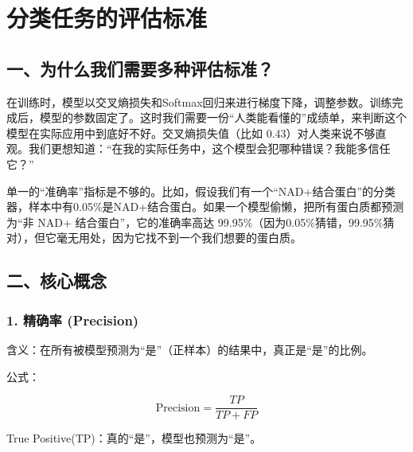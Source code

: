 \setcounter{section}{1}

\hypertarget{ux5206ux7c7bux4efbux52a1ux7684ux8bc4ux4f30ux6807ux51c6}{%
\section{分类任务的评估标准}\label{ux5206ux7c7bux4efbux52a1ux7684ux8bc4ux4f30ux6807ux51c6}}

\hypertarget{ux4e00ux4e3aux4ec0ux4e48ux6211ux4eecux9700ux8981ux591aux79cdux8bc4ux4f30ux6807ux51c6}{%
\subsection{一、为什么我们需要多种评估标准？}\label{ux4e00ux4e3aux4ec0ux4e48ux6211ux4eecux9700ux8981ux591aux79cdux8bc4ux4f30ux6807ux51c6}}

在训练时，模型以交叉熵损失和Softmax回归来进行梯度下降，调整参数。训练完成后，模型的参数固定了。这时我们需要一份``人类能看懂的''成绩单，来判断这个模型在实际应用中到底好不好。交叉熵损失值（比如 0.43）对人类来说不够直观。我们更想知道：``在我的实际任务中，这个模型会犯哪种错误？我能多信任它？''

单一的``准确率''指标是不够的。比如，假设我们有一个``NAD+结合蛋白''的分类器，样本中有0.05\%是NAD+结合蛋白。如果一个模型偷懒，把所有蛋白质都预测为``非 NAD+ 结合蛋白''，它的准确率高达 99.95\%（因为0.05\%猜错，99.95\%猜对），但它毫无用处，因为它找不到一个我们想要的蛋白质。

\hypertarget{ux4e8cux6838ux5fc3ux6982ux5ff5}{%
\subsection{二、核心概念}\label{ux4e8cux6838ux5fc3ux6982ux5ff5}}

\hypertarget{ux7cbeux786eux7387-precision}{%
\subsubsection{1. 精确率 (Precision)}\label{ux7cbeux786eux7387-precision}}

含义：在所有被模型预测为``是''（正样本）的结果中，真正是``是''的比例。

公式：

\[
\mathrm{Precision}=\frac{TP}{TP+FP}
\]

True Positive(TP)：真的``是''，模型也预测为``是''。

